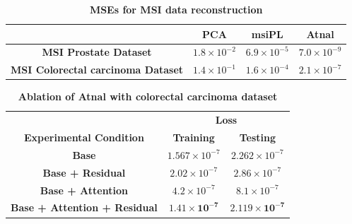\documentclass{WileyMSP-template}
\begin{document}
\begin{table}[htbp]
  \centering
  \caption{\textbf{MSEs for MSI data reconstruction}}
  \label{tbl:model performance}
  \begin{tabular}{cccc}
    \toprule
    & \textbf{PCA} & \textbf{msiPL} & \textbf{Atnal} \\
    \midrule
    \textbf{MSI Prostate Dataset} & $1.8 \times 10^{-2}$ & $6.9 \times 10^{-5}$ & $7.0 \times 10^{-9}$ \\
    \textbf{MSI Colorectal carcinoma Dataset} & $1.4 \times 10^{-1}$ & $1.6 \times 10^{-4}$ & $2.1 \times 10^{-7}$ \\
    \bottomrule
  \end{tabular}
\end{table}
\begin{table}[htbp]
  \centering
  \caption{\textbf{Ablation of Atnal with colorectal carcinoma dataset}}
  \label{tab:ablation_experiment}
  \begin{tabular}{ccc}
    \toprule
    & \multicolumn{2}{c}{\textbf{Loss}} \\
    \cmidrule{2-3}
    \textbf{Experimental Condition} & \textbf{Training} & \textbf{Testing} \\
    \midrule
    \textbf{Base} & $1.567 \times 10^{-7}$ & $2.262 \times 10^{-7}$ \\
    \textbf{Base + Residual} & $2.02 \times 10^{-7}$ & $2.86 \times 10^{-7}$ \\
    \textbf{Base + Attention} & $4.2 \times 10^{-7}$ & $8.1 \times 10^{-7}$ \\
    \textbf{Base + Attention + Residual} & $\mathbf{1.41 \times 10^{-7}}$ & $\mathbf{2.119 \times 10^{-7}}$ \\
    \bottomrule
  \end{tabular}
\end{table}
\end{document}
